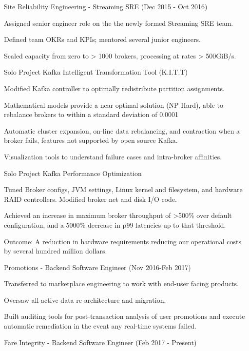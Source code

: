 \documentclass[10pt,letterpaper]{article}
\begin{document}
{\begin{itemize*}
\begin{itemize*}
\end{itemize*}
\item Site Reliability Engineering - Streaming SRE (Dec 2015 - Oct 2016)
\begin{itemize*}
  \item Assigned senior engineer role on the the newly formed Streaming SRE team. 
  \item Defined team OKRs and KPIs; mentored several junior engineers.
  \item Scaled capacity from zero to > 1000 brokers, processing at rates > 500GiB/s.
  \item [Solo Project] Kafka Intelligent Transformation Tool (K.I.T.T) 
    \item Modified Kafka controller to optimally redistribute partition assignments.
    \item Mathematical models provide a near optimal solution (NP Hard), able to rebalance brokers to within a standard deviation of 0.0001%
    \item Automatic cluster expansion, on-line data rebalancing, and contraction when a broker fails, features not supported by open source Kafka.
    \item Visualization tools to understand failure cases and intra-broker affinities.
  \item [Solo Project] Kafka Performance Optimization
    \item Tuned Broker configs, JVM settings, Linux kernel and filesystem, and hardware RAID controllers. Modified broker net and disk I/O code.
    \item Achieved an increase in maximum broker throughput of >500\% over default configuration, and a 5000\% decrease in p99 latencies up to that threshold.
    \item Outcome: A reduction in hardware requirements reducing our operational costs by several hundred million dollars.
\end{itemize*}
\item Promotions - Backend Software Engineer (Nov 2016-Feb 2017)
    \item Transferred to marketplace engineering to work with end-user facing products. 
    \item Oversaw all-active data re-architecture and migration.
    \item Built auditing tools for post-transaction analysis of user promotions and execute automatic remediation in the event any real-time systems failed.
\item Fare Integrity - Backend Software Engineer (Feb 2017 - Present)

\end{itemize*}}
\end{document}
